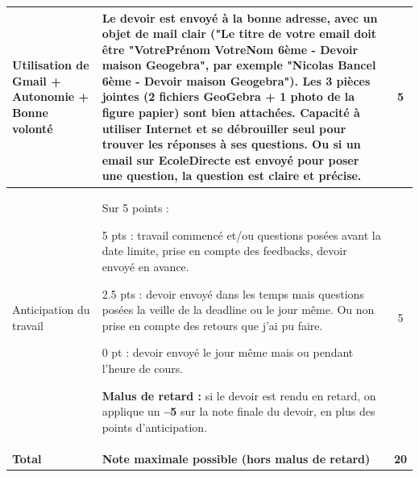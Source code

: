 \documentclass[answers]{exam}
\begin{document}
{\begin{longtable}{|L{0.3\textwidth}|L{0.7\textwidth}|c|}

Utilisation de Gmail + Autonomie + Bonne volonté
& Le devoir est envoyé à la bonne adresse, avec un objet de mail clair ("Le titre de votre email doit être "VotrePrénom VotreNom 6ème - Devoir maison Geogebra", par exemple "Nicolas Bancel 6ème - Devoir maison Geogebra").
  Les 3 pièces jointes (2 fichiers GeoGebra + 1 photo de la figure papier) sont bien attachées. 
  Capacité à utiliser Internet et se débrouiller seul pour trouver les réponses à ses questions.
  Ou si un email sur EcoleDirecte est envoyé pour poser une question, la question est claire et précise.
& 5 \\ [6pt]
\hline


  Anticipation du travail
  & Sur 5 points :  
  \begin{compactitem}
    \item 5 pts : travail commencé et/ou questions posées avant la date limite, prise en compte des feedbacks, devoir envoyé en avance.
    \item 2.5 pts : devoir envoyé dans les temps mais questions posées la veille de la deadline ou le jour même. Ou non prise en compte des retours que j'ai pu faire.
    \item 0 pt : devoir envoyé le jour même mais ou pendant l'heure de cours. 
  \end{compactitem}
  \textbf{Malus de retard :} si le devoir est rendu en retard, on applique un \textbf{–5} sur la note finale du devoir, en plus des points d’anticipation.
  & 5 \\[6pt]
\hline

 \textbf{Total} & \textbf{Note maximale possible (hors malus de retard)} & \textbf{20} \\
\hline

\end{longtable}
}
\end{document}
